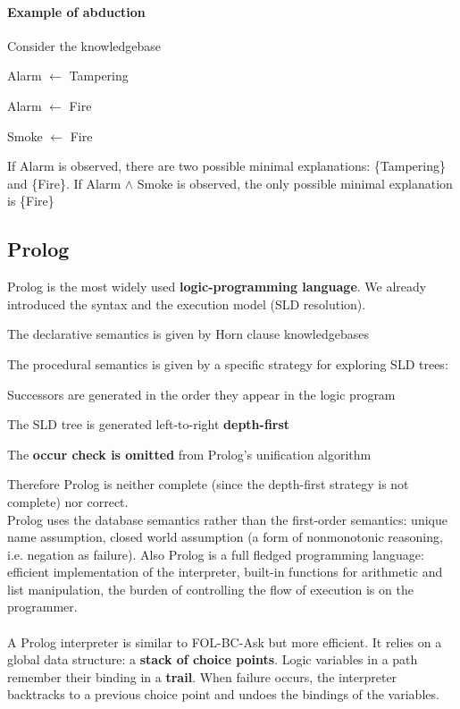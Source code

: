 \documentclass[10pt]{report}
\begin{document}
\paragraph{Example of abduction} Consider the knowledgebase
\begin{list}{}{}
	\item Alarm $\leftarrow$ Tampering
	\item Alarm $\leftarrow$ Fire
	\item Smoke $\leftarrow$ Fire
\end{list}
If Alarm is observed, there are two possible minimal explanations: \{Tampering\} and \{Fire\}. If Alarm $\wedge$ Smoke is observed, the only possible minimal explanation is \{Fire\}
\subsection{Prolog} Prolog is the most widely used \textbf{logic-programming language}. We already introduced the syntax and the execution model (SLD resolution).
\begin{list}{}{}
	\item The declarative semantics is given by Horn clause knowledgebases
	\item The procedural semantics is given by a specific strategy for exploring SLD trees:
	\begin{list}{}{}
		\item Successors are generated in the order they appear in the logic program
		\item The SLD tree is generated left-to-right \textbf{depth-first}
	\end{list}
	\item The \textbf{occur check is omitted} from Prolog's unification algorithm
\end{list}
Therefore Prolog is neither complete (since the depth-first strategy is not complete) nor correct.\\
Prolog uses the database semantics rather than the first-order semantics: unique name assumption, closed world assumption (a form of nonmonotonic reasoning, i.e. negation as failure). Also Prolog is a full fledged programming language: efficient implementation of the interpreter, built-in functions for arithmetic and list manipulation, the burden of controlling the flow of execution is on the programmer.\\\\
A Prolog interpreter is similar to FOL-BC-Ask but more efficient. It relies on a global data structure: a \textbf{stack of choice points}. Logic variables in a path remember their binding in a \textbf{trail}. When failure occurs, the interpreter backtracks to a previous choice point and undoes the bindings of the variables.\\
\end{document}
